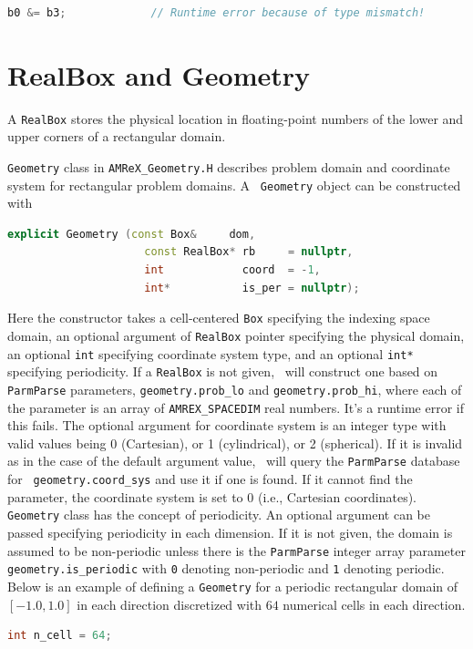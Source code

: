 {\begin{lstlisting}[language=cpp]
  b0 &= b3;             // Runtime error because of type mismatch!
\end{lstlisting}

\section{RealBox and Geometry}

A {\tt RealBox} stores the physical location in floating-point numbers
of the lower and upper corners of a rectangular domain.

{\tt Geometry} class in {\tt AMReX\_Geometry.H} describes problem
domain and coordinate system for rectangular problem domains.  A {\tt
  Geometry} object can be constructed with
\begin{lstlisting}[language=cpp]
  explicit Geometry (const Box&     dom,
                     const RealBox* rb     = nullptr,
                     int            coord  = -1,
                     int*           is_per = nullptr);
\end{lstlisting}
Here the constructor takes a cell-centered {\tt Box} specifying the
indexing space domain, an optional argument of {\tt RealBox} pointer
specifying the physical domain, an optional {\tt int} specifying
coordinate system type, and an optional {\tt int*} specifying
periodicity.  If a {\tt RealBox} is not given, \amrex\ will construct
one based on {\tt ParmParse} parameters, {\tt geometry.prob\_lo} and
{\tt geometry.prob\_hi}, where each of the parameter is an array of
{\tt AMREX\_SPACEDIM} real numbers.  It's a runtime error if this
fails.  The optional argument for coordinate system is an integer type
with valid values being 0 (Cartesian), or 1 (cylindrical), or 2
(spherical).  If it is invalid as in the case of the default argument
value, \amrex\ will query the {\tt ParmParse} database for {\tt
  geometry.coord\_sys} and use it if one is found.  If it cannot find
the parameter, the coordinate system is set to 0 (i.e., Cartesian
coordinates).  {\tt Geometry} class has the concept of periodicity.
An optional argument can be passed specifying periodicity in each
dimension.  If it is not given, the domain is assumed to be
non-periodic unless there is the {\tt ParmParse} integer array
parameter {\tt geometry.is\_periodic} with {\tt 0} denoting
non-periodic and {\tt 1} denoting periodic.  Below is an example of
defining a {\tt Geometry} for a periodic rectangular domain of
$[-1.0,1.0]$ in each direction discretized with $64$ numerical cells
in each direction.
\begin{lstlisting}[language=cpp]
  int n_cell = 64;


\end{lstlisting}}
